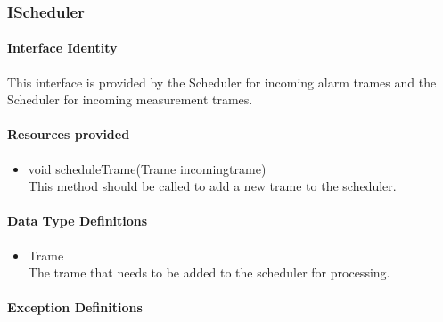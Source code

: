 \subsubsection{IScheduler}
\paragraph{Interface Identity}
This interface is provided by the Scheduler for incoming alarm trames and the Scheduler
	for incoming measurement trames.
\paragraph{Resources provided}
\begin{itemize}
	\item{void scheduleTrame(Trame incomingtrame)}\\
	This method should be called to add a new trame to the scheduler.
\end{itemize}
\paragraph{Data Type Definitions}
\begin{itemize}
	\item Trame\\
	The trame that needs to be added to the scheduler for processing.
\end{itemize}
\paragraph{Exception Definitions}
